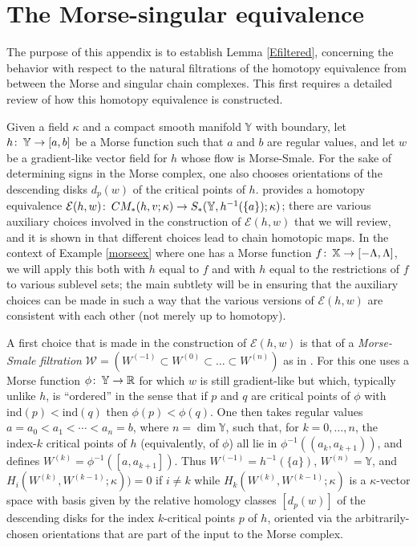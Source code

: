 \documentclass[11pt]{amsart}
\theoremstyle{definition}
\theoremstyle{remark}
\numberwithin{equation}{section}
\def\co{\colon\thinspace}
\def\R{\mathbb{R}}
\begin{document}
\appendix

\section{The Morse-singular equivalence}\label{app}

The purpose of this appendix is to establish Lemma \ref{Efiltered}, concerning the behavior with respect to the natural filtrations of the homotopy equivalence from \cite{Paj} between the Morse and singular chain complexes. This first requires a detailed review of how this homotopy equivalence is constructed. 

Given a field  $\kappa$ and a compact smooth manifold $\mathbb{Y}$ with boundary, let $h\co \mathbb{Y}\to [a,b]$ be a Morse function such that $a$ and $b$ are regular values, and let $w$ be a gradient-like vector field for $h$ whose flow is Morse-Smale.  For the sake of determining signs in the Morse complex, one also chooses orientations of the descending disks $d_p(w)$ of the critical points of $h$.  \cite{Paj} provides a homotopy equivalence $\mathcal{E}(h,w)\co CM_{*}(h,v;\kappa)\to S_*(\mathbb{Y},h^{-1}(\{a\});\kappa)$; there are various auxiliary choices involved in the construction of $\mathcal{E}(h,w)$ that we will review, and it is shown in \cite{Paj} that different choices lead to chain homotopic maps.  In the context of Example \ref{morseex} where one has a Morse function $f\co\mathbb{X}\to [-\Lambda,\Lambda]$, we will apply this both with $h$ equal to $f$ and with $h$ equal to the restrictions of $f$ to various sublevel sets; the main subtlety will be in ensuring that the auxiliary choices can be made in such a way that the  various versions of $\mathcal{E}(h,w)$ are consistent with each other (not merely up to homotopy).

A first choice that is made in the construction of $\mathcal{E}(h,w)$ is that of a \emph{Morse-Smale filtration} $\mathcal{W}=\left(W^{(-1)}\subset W^{(0)}\subset \ldots\subset W^{(n)}\right)$ as in \cite[Section 4.3.8]{Paj}.  For this one uses a Morse function $\phi\co \mathbb{Y}\to \R$ for  which $w$ is still gradient-like but which, typically unlike $h$, is ``ordered'' in the sense that if $p$ and $q$ are critical points of $\phi$ with $\mathrm{ind}(p)<\mathrm{ind}(q)$ then $\phi(p)<\phi(q)$. One then takes regular values $a=a_0<a_1<\cdots<a_n=b$, where $n=\dim \mathbb{Y}$, such that, for $k=0,\ldots,n$, the index-$k$ critical points of $h$ (equivalently, of $\phi$) all lie in $\phi^{-1}((a_k,a_{k+1}))$, and defines $W^{(k)}=\phi^{-1}([a,a_{k+1}])$.  Thus $W^{(-1)}=h^{-1}(\{a\})$, $W^{(n)}=\mathbb{Y}$, and $H_i(W^{(k)},W^{(k-1)};\kappa))=0$ if $i\neq k$ while $H_k(W^{(k)},W^{(k-1)};\kappa)$ is a  $\kappa$-vector space with basis given by the relative homology classes $[d_p(w)]$ of the descending disks  for the index $k$-critical points $p$ of $h$, oriented via the arbitrarily-chosen orientations that are part of the input to the Morse complex.
\end{document}
